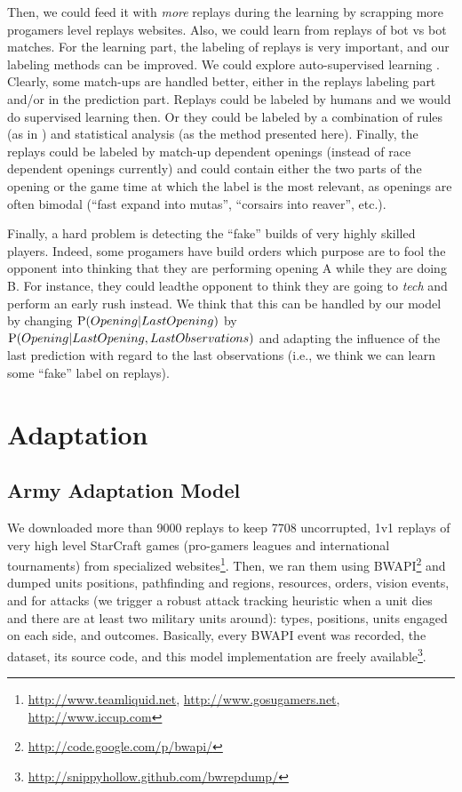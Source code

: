 Then, we could feed it with \textit{more} replays during the learning by scrapping more progamers level replays websites. Also, we could learn from replays of bot vs bot matches. For the learning part, the labeling of replays is very important, and our labeling methods can be improved. 
We could explore auto-supervised learning \citep{AutoSuperLearning}. 
Clearly, some match-ups are handled better, either in the replays labeling part and/or in the prediction part. Replays could be labeled by humans and we would do supervised learning then. Or they could be labeled by a combination of rules (as in \citep{weberStrat}) and statistical analysis (as the method presented here). Finally, the replays could be labeled by match-up dependent openings (instead of race dependent openings currently) and could contain either the two parts of the opening %
or the game time at which the label is the most relevant, as openings are often bimodal (``fast expand into mutas'', ``corsairs into reaver'', etc.).

Finally, a hard problem is detecting the ``fake'' builds of very highly skilled players. Indeed, some progamers have build orders which purpose are to fool the opponent into thinking that they are performing opening A while they are doing B. %
For instance, they could leadthe opponent to think they are going to \textit{tech} 
and perform an early rush instead. We think that this can be handled by our model by changing $\mathrm{P}(Opening|LastOpening)$ by $\mathrm{P}(Opening|LastOpening, LastObservations)$ and adapting the influence of the last prediction with regard to the last observations (i.e., we think we can learn some ``fake'' label on replays).

\section{Adaptation}
\subsection{Army Adaptation Model}
We downloaded more than 9000 replays to keep 7708 uncorrupted, 1v1 replays of very high level StarCraft games (pro-gamers leagues and international tournaments) from specialized websites\footnote{\url{http://www.teamliquid.net}, \url{http://www.gosugamers.net}, \url{http://www.iccup.com}}. Then, we ran them using BWAPI\footnote{\url{http://code.google.com/p/bwapi/}} and dumped units positions, pathfinding and regions, resources, orders, vision events, and for attacks (we trigger a robust attack tracking heuristic when a unit dies and there are at least two military units around): types, positions, units engaged on each side, and outcomes. Basically, every BWAPI event was recorded, the dataset, its source code, and this model implementation are freely available\footnote{\url{http://snippyhollow.github.com/bwrepdump/}}. 

